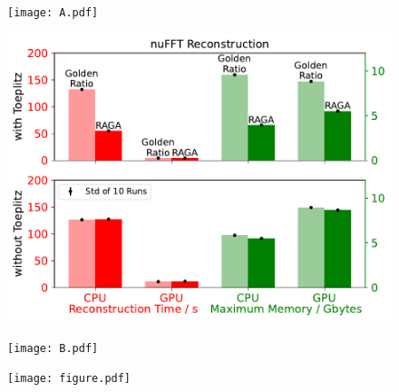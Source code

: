 \documentclass[preview]{standalone}
\begin{document}
\begin{minipage}{.04\textwidth}
	\begin{figure}
		\centering
		\texttt{[image: A.pdf]}\vspace*{4cm}
	\end{figure}
\end{minipage}
\hspace*{-0.5cm}
\begin{minipage}{.48\textwidth}
	\begin{figure}
		\centering
		\includegraphics[align=c,width=\textwidth]{../04a_speedup_num_error/figure_ref.pdf}
	\end{figure}
\end{minipage}
\hspace*{0.3cm}
\begin{minipage}{.04\textwidth}
	\begin{figure}
		\centering
		\texttt{[image: B.pdf]}\vspace*{4cm}
	\end{figure}
\end{minipage}
\hspace*{-0.5cm}
\begin{minipage}{.38\textwidth}
	\begin{figure}
		\centering
		\texttt{[image: figure.pdf]}
	\end{figure}
\end{minipage}




\end{document}
